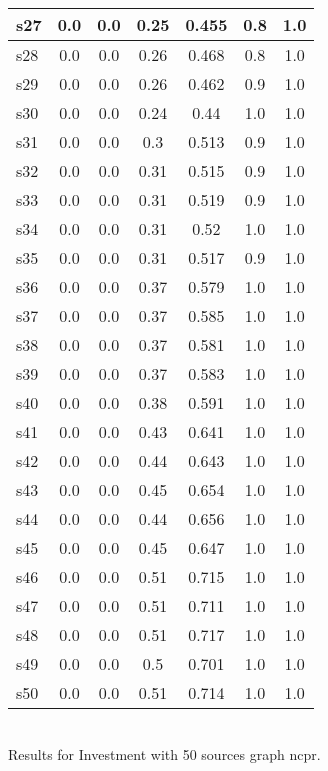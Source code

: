 \documentclass{article}
\begin{document}
\begin{tabular}{|l|c|c|c|c|c|c|}
\hline
s27 &0.0 & 0.0 & 0.25 & 0.455 & 0.8 & 1.0\\
\hline
s28 &0.0 & 0.0 & 0.26 & 0.468 & 0.8 & 1.0\\
\hline
s29 &0.0 & 0.0 & 0.26 & 0.462 & 0.9 & 1.0\\
\hline
s30 &0.0 & 0.0 & 0.24 & 0.44 & 1.0 & 1.0\\
\hline
s31 &0.0 & 0.0 & 0.3 & 0.513 & 0.9 & 1.0\\
\hline
s32 &0.0 & 0.0 & 0.31 & 0.515 & 0.9 & 1.0\\
\hline
s33 &0.0 & 0.0 & 0.31 & 0.519 & 0.9 & 1.0\\
\hline
s34 &0.0 & 0.0 & 0.31 & 0.52 & 1.0 & 1.0\\
\hline
s35 &0.0 & 0.0 & 0.31 & 0.517 & 0.9 & 1.0\\
\hline
s36 &0.0 & 0.0 & 0.37 & 0.579 & 1.0 & 1.0\\
\hline
s37 &0.0 & 0.0 & 0.37 & 0.585 & 1.0 & 1.0\\
\hline
s38 &0.0 & 0.0 & 0.37 & 0.581 & 1.0 & 1.0\\
\hline
s39 &0.0 & 0.0 & 0.37 & 0.583 & 1.0 & 1.0\\
\hline
s40 &0.0 & 0.0 & 0.38 & 0.591 & 1.0 & 1.0\\
\hline
s41 &0.0 & 0.0 & 0.43 & 0.641 & 1.0 & 1.0\\
\hline
s42 &0.0 & 0.0 & 0.44 & 0.643 & 1.0 & 1.0\\
\hline
s43 &0.0 & 0.0 & 0.45 & 0.654 & 1.0 & 1.0\\
\hline
s44 &0.0 & 0.0 & 0.44 & 0.656 & 1.0 & 1.0\\
\hline
s45 &0.0 & 0.0 & 0.45 & 0.647 & 1.0 & 1.0\\
\hline
s46 &0.0 & 0.0 & 0.51 & 0.715 & 1.0 & 1.0\\
\hline
s47 &0.0 & 0.0 & 0.51 & 0.711 & 1.0 & 1.0\\
\hline
s48 &0.0 & 0.0 & 0.51 & 0.717 & 1.0 & 1.0\\
\hline
s49 &0.0 & 0.0 & 0.5 & 0.701 & 1.0 & 1.0\\
\hline
s50 &0.0 & 0.0 & 0.51 & 0.714 & 1.0 & 1.0\\
\hline
\end{tabular}\\

\noindent Results for Investment with 50 sources graph ncpr.
\end{document}
